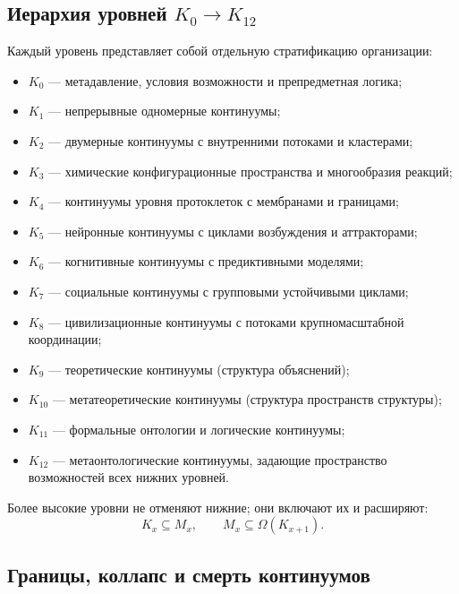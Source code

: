 \subsection{Иерархия уровней $K_0 \to K_{12}$}

Каждый уровень представляет собой отдельную стратификацию организации:

\begin{itemize}
    \item $K_0$ — метадавление, условия возможности и препредметная логика;
    \item $K_1$ — непрерывные одномерные континуумы;
    \item $K_2$ — двумерные континуумы с внутренними потоками и кластерами;
    \item $K_3$ — химические конфигурационные пространства и многообразия реакций;
    \item $K_4$ — континуумы уровня протоклеток с мембранами и границами;
    \item $K_5$ — нейронные континуумы с циклами возбуждения и аттракторами;
    \item $K_6$ — когнитивные континуумы с предиктивными моделями;
    \item $K_7$ — социальные континуумы с групповыми устойчивыми циклами;
    \item $K_8$ — цивилизационные континуумы с потоками крупномасштабной координации;
    \item $K_9$ — теоретические континуумы (структура объяснений);
    \item $K_{10}$ — метатеоретические континуумы (структура пространств структуры);
    \item $K_{11}$ — формальные онтологии и логические континуумы;
    \item $K_{12}$ — метаонтологические континуумы, задающие пространство
                     возможностей всех нижних уровней.
\end{itemize}

Более высокие уровни не отменяют нижние; они включают их и расширяют:
\[
K_x \subseteq M_x,
\qquad
M_x \subseteq \Omega(K_{x+1}).
\]


\subsection{Границы, коллапс и смерть континуумов}

